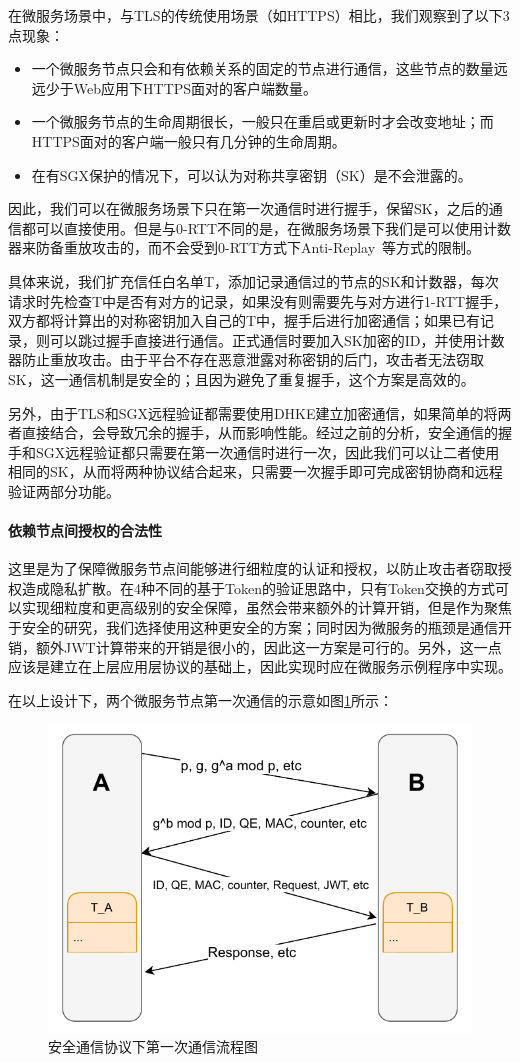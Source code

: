 在微服务场景中，与TLS的传统使用场景（如HTTPS）相比，我们观察到了以下3点现象：

\begin{itemize}
    \item 一个微服务节点只会和有依赖关系的固定的节点进行通信，这些节点的数量远远少于Web应用下HTTPS面对的客户端数量。
    \item 一个微服务节点的生命周期很长，一般只在重启或更新时才会改变地址；而HTTPS面对的客户端一般只有几分钟的生命周期。
    \item 在有SGX保护的情况下，可以认为对称共享密钥（SK）是不会泄露的。
\end{itemize}

因此，我们可以在微服务场景下只在第一次通信时进行握手，保留SK，之后的通信都可以直接使用。但是与0-RTT不同的是，在微服务场景下我们是可以使用计数器来防备重放攻击的，而不会受到0-RTT方式下Anti-Replay~\cite{8446}等方式的限制。

具体来说，我们扩充信任白名单T，添加记录通信过的节点的SK和计数器，每次请求时先检查T中是否有对方的记录，如果没有则需要先与对方进行1-RTT握手，双方都将计算出的对称密钥加入自己的T中，握手后进行加密通信；如果已有记录，则可以跳过握手直接进行通信。正式通信时要加入SK加密的ID，并使用计数器防止重放攻击。由于平台不存在恶意泄露对称密钥的后门，攻击者无法窃取SK，这一通信机制是安全的；且因为避免了重复握手，这个方案是高效的。

另外，由于TLS和SGX远程验证都需要使用DHKE建立加密通信，如果简单的将两者直接结合，会导致冗余的握手，从而影响性能。经过之前的分析，安全通信的握手和SGX远程验证都只需要在第一次通信时进行一次，因此我们可以让二者使用相同的SK，从而将两种协议结合起来，只需要一次握手即可完成密钥协商和远程验证两部分功能。

\paragraph{依赖节点间授权的合法性}
这里是为了保障微服务节点间能够进行细粒度的认证和授权，以防止攻击者窃取授权造成隐私扩散。在4种不同的基于Token的验证思路中，只有Token交换的方式可以实现细粒度和更高级别的安全保障，虽然会带来额外的计算开销，但是作为聚焦于安全的研究，我们选择使用这种更安全的方案；同时因为微服务的瓶颈是通信开销，额外JWT计算带来的开销是很小的，因此这一方案是可行的。另外，这一点应该是建立在上层应用层协议的基础上，因此实现时应在微服务示例程序中实现。

在以上设计下，两个微服务节点第一次通信的示意如图\ref{fig:communication}所示：

\begin{figure}[!ht]
    \centering
    \includegraphics[width=.5\textwidth]{figures/communication.pdf}
    \caption{安全通信协议下第一次通信流程图}
    \label{fig:communication}
\end{figure}

